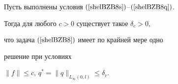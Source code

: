 \begin{thmnonum} \label{BZ_Izv05_T1}


Пусть выполнены условия $(\ref{shelBZB8s})$--$(\ref{shelBZB8q})$.


Тогда для любого $c{>}0$ существует такое $\delta_c{>}0$,


что задача $(\ref{shelBZB8})$ имеет по крайней мере одно


решение при условиях


$\| f \| \leq c$, $q^*=\| q \|_{L_{\infty}(0,l)} \leq \delta_c$.


\end{thmnonum}













